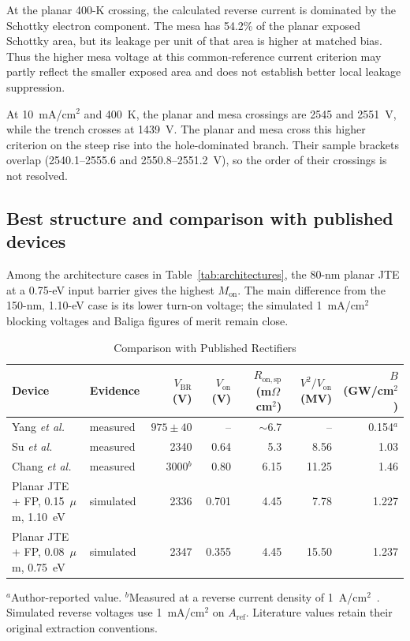 \documentclass[journal,10pt]{IEEEtran}
\newcommand{\Ron}{\ensuremath{R_{\mathrm{on,sp}}}}
\begin{document}
At the planar 400-K crossing, the calculated reverse current is dominated by the Schottky electron component. The mesa has 54.2\% of the planar exposed Schottky area, but its leakage per unit of that area is higher at matched bias. Thus the higher mesa voltage at this common-reference current criterion may partly reflect the smaller exposed area and does not establish better local leakage suppression.

At 10~mA/cm$^2$ and 400~K, the planar and mesa crossings are 2545 and 2551~V, while the trench crosses at 1439~V. The planar and mesa cross this higher criterion on the steep rise into the hole-dominated branch. Their sample brackets overlap (2540.1--2555.6 and 2550.8--2551.2~V), so the order of their crossings is not resolved.
\subsection{Best structure and comparison with published devices}
Among the architecture cases in Table~\ref{tab:architectures}, the 80-nm planar JTE at a 0.75-eV input barrier gives the highest $M_{\mathrm{on}}$. The main difference from the 150-nm, 1.10-eV case is its lower turn-on voltage; the simulated 1~mA/cm$^2$ blocking voltages and Baliga figures of merit remain close.

\begin{table}[!t]
\caption{Comparison with Published Rectifiers}
\label{tab:literature}
\centering\scriptsize
\setlength{\tabcolsep}{2.2pt}
\begin{tabular}{>{\raggedright\arraybackslash}p{2.1cm}lrrrrr}
\toprule
Device & Evidence & $V_{\mathrm{BR}}$ (V) & $V_{\mathrm{on}}$ (V) & $\Ron$ (m$\Omega$\,cm$^2$) & $V^2/V_{\mathrm{on}}$ (MV) & $B$ (GW/cm$^2$)\\
\midrule
Yang \emph{et al.}~\cite{Yang2017} & measured & $975\pm40$ & -- & $\sim$6.7 & -- & 0.154$^{a}$\\
Su \emph{et al.}~\cite{Su2024_APL} & measured & 2340 & 0.64 & 5.3 & 8.56 & 1.03\\
Chang \emph{et al.}~\cite{Chang2025_APL} & measured & 3000$^{b}$ & 0.80 & 6.15 & 11.25 & 1.46\\
Planar JTE + FP, 0.15~$\mu$m, 1.10~eV & simulated & 2336 & 0.701 & 4.45 & 7.78 & 1.227\\
Planar JTE + FP, 0.08~$\mu$m, 0.75~eV & simulated & 2347 & 0.355 & 4.45 & 15.50 & 1.237\\
\bottomrule
\end{tabular}
\par\smallskip\begin{minipage}{0.98\columnwidth}\footnotesize
$^{a}$Author-reported value. $^{b}$Measured at a reverse current density of 1~A/cm$^2$~\cite{Chang2025_APL}. Simulated reverse voltages use 1~mA/cm$^2$ on $A_{\mathrm{ref}}$. Literature values retain their original extraction conventions.
\end{minipage}
\end{table}
\end{document}

